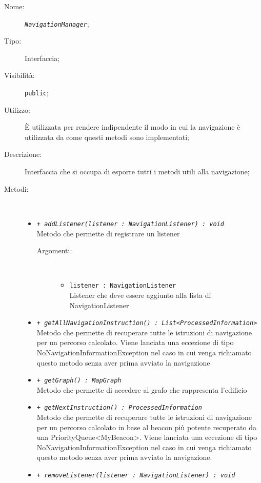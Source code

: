 \documentclass[../DefinizioneDiProdotto.tex]{subfiles}
\begin{document}
\begin{description}
	\item[Nome:] \texttt{\textit{NavigationManager}};
	\item[Tipo:] Interfaccia;
	\item[Visibilità:] \texttt{public};
	\item[Utilizzo:] È utilizzata per rendere indipendente il modo in cui la navigazione è utilizzata da come questi metodi sono implementati;
	\item[Descrizione:] Interfaccia che si occupa di esporre tutti i metodi utili alla navigazione;
	\item[Metodi:] \
	\begin{itemize}
		\item \texttt{+ \textit{addListener(listener : NavigationListener) : void}}\\
		Metodo che permette di registrare un listener
		\begin{description}
			\item[Argomenti:] \
			\begin{itemize}
				\item \texttt{listener : NavigationListener}\\
				Listener che deve essere aggiunto alla lista di NavigationListener\end{itemize}
		\end{description}
		\item \texttt{+ \textit{getAllNavigationInstruction() : List<ProcessedInformation>}}\\
		Metodo che permette di recuperare tutte le istruzioni di navigazione per un percorso calcolato. Viene lanciata una eccezione di tipo NoNavigationInformationException nel caso in cui venga richiamato questo metodo senza aver prima avviato la navigazione
		\item \texttt{+ \textit{getGraph() : MapGraph}}\\
		Metodo che permette di accedere al grafo che rappresenta l'edificio
		\item \texttt{+ \textit{getNextInstruction() : ProcessedInformation}}\\
		Metodo che permette di recuperare tutte le istruzioni di navigazione per un percorso calcolato in base al beacon più potente recuperato da una PriorityQueue<MyBeacon>.  Viene lanciata una eccezione di tipo NoNavigationInformationException nel caso in cui venga richiamato questo metodo senza aver prima avviato la navigazione.
		\item \texttt{+ \textit{removeListener(listener : NavigationListener) : void}}\\

\end{itemize}
\end{description}
\end{document}
